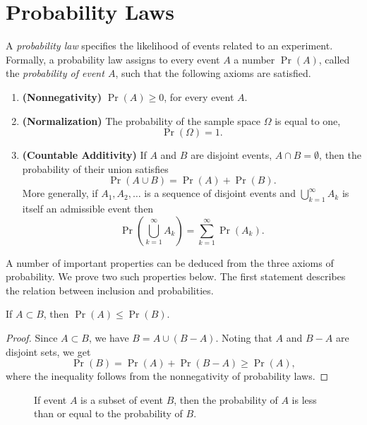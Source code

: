 \section{Probability Laws}
\label{section:ProbabilityLaws}

A \emph{probability law} specifies the likelihood of events related to an experiment.
Formally, a probability law assigns to every event $A$ a number $\Pr (A)$, called the \emph{probability of event $A$}, such that the following axioms are satisfied.
\begin{enumerate}
\item \textbf{(Nonnegativity)} $\Pr (A) \geq 0$, for every event $A$.
\item \textbf{(Normalization)} The probability of the sample space $\Omega$ is equal to one,
\begin{equation*}
\Pr (\Omega) = 1 .
\end{equation*}
\item \textbf{(Countable Additivity)} If $A$ and $B$ are disjoint events, $A \cap B = \emptyset$, then the probability of their union satisfies
\begin{equation*}
\Pr (A \cup B) = \Pr (A) + \Pr (B) .
\end{equation*}
More generally, if $A_1, A_2, \ldots$ is a sequence of disjoint events and $\bigcup_{k=1}^{\infty} A_k$ is itself an admissible event then
\begin{equation*}
\Pr \left( \bigcup_{k=1}^{\infty} A_k \right)
= \sum_{k = 1}^{\infty} \Pr (A_k) .
\end{equation*}
\end{enumerate}

A number of important properties can be deduced from the three axioms of probability.
We prove two such properties below.
The first statement describes the relation between inclusion and probabilities.
\begin{proposition}
If $A \subset B$, then $\Pr (A) \leq \Pr (B)$.
\end{proposition}
\begin{proof}
Since $A \subset B$, we have $B = A \cup (B - A)$.
Noting that $A$ and $B - A$ are disjoint sets, we get
\begin{equation*}
\Pr (B) = \Pr (A) + \Pr (B - A) \geq \Pr (A) ,
\end{equation*}
where the inequality follows from the nonnegativity of probability laws.
\end{proof}
\begin{figure}[htb!]
\begin{center}
\caption{If event $A$ is a subset of event $B$, then the probability of $A$ is less than or equal to the probability of $B$.}
\end{center}
\end{figure}

